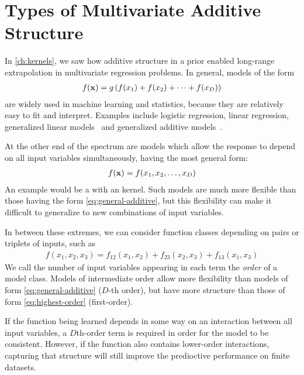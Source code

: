 \section{Types of Multivariate Additive Structure}
In \cref{ch:kernels}, we saw how additive structure in a \gp{} prior enabled long-range extrapolation in multivariate regression problems.
In general, models of the form
%
\begin{align}
f({\bf{x}}) = g \left( f(x_1) + f(x_2) + \dots + f(x_D) \right)
\label{eq:general-additive}
\end{align}
%
are widely used in machine learning and statistics, because they are relatively easy to fit and interpret.
Examples include logistic regression, linear regression, generalized linear models~\citep{nelder1972generalized} and generalized additive models~\citep{hastie1990generalized}.

At the other end of the spectrum are models which allow the response to depend on all input variables simultaneously, having the most general form:
%
\begin{align}
f({\bf{x}}) = f(x_1, x_2, \dots, x_D)
\label{eq:highest-order}
\end{align}
%
An example would be a \gp{} with an \seard{} kernel.
Such models are much more flexible than those having the form \eqref{eq:general-additive}, but this flexibility can make it difficult to generalize to new combinations of input variables.

In between these extremes, we can consider function classes depending on pairs or triplets of inputs, such as
%
\begin{align}
f(x_1, x_2, x_3) = f_{12}(x_1, x_2) + f_{23}(x_2, x_3) + f_{13}(x_1, x_3)
\label{eq:second-order-additive}
\end{align}
%
We call the number of input variables appearing in each term the \emph{order} of a model class.
Models of intermediate order allow more flexibility than models of form \eqref{eq:general-additive} ($D$-th order), but have more structure than those of form \eqref{eq:highest-order} (first-order).

If the function being learned depends in some way on an interaction between all input variables, a $D$th-order term is required in order for the model to be consistent.
However, if the function also contains lower-order interactions, capturing that structure will still improve the predioctive performance on finite datasets.

